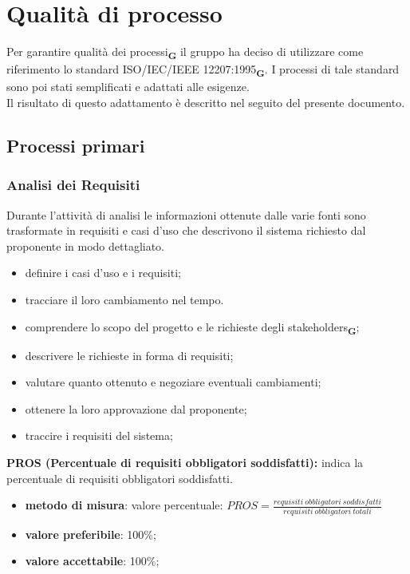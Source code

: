 \section{Qualità di processo}
Per garantire qualità dei processi\textsubscript{\textbf{G}} il gruppo ha deciso di utilizzare come riferimento lo standard ISO/IEC/IEEE 12207:1995\textsubscript{\textbf{G}}. 
I processi di tale standard sono poi stati semplificati e adattati alle esigenze.\\Il risultato di questo adattamento è descritto nel seguito del presente documento.
\subsection{Processi primari}
\subsubsection{Analisi dei Requisiti}
Durante l'attività di analisi le informazioni ottenute dalle varie fonti sono trasformate in requisiti e casi d'uso che descrivono il sistema richiesto
dal proponente in modo dettagliato.
\begin{itemize}
    \item definire i casi d'uso e i requisiti;
    \item tracciare il loro cambiamento nel tempo.
\end{itemize}
\begin{itemize}
    \item comprendere lo scopo del progetto e le richieste degli stakeholders\textsubscript{\textbf{G}};
    \item descrivere le richieste in forma di requisiti;
    \item valutare quanto ottenuto e negoziare eventuali cambiamenti;
    \item ottenere la loro approvazione dal proponente;
    \item traccire i requisiti del sistema;
\end{itemize}
\textbf{PROS (Percentuale di requisiti obbligatori soddisfatti):} indica la percentuale di requisiti obbligatori soddisfatti.
\begin{itemize}
    \item \textbf{metodo di misura}: valore percentuale: $PROS = \frac{requisiti \ obbligatori \ soddisfatti}{requisiti \ obbligatori \ totali}$
    \item \textbf{valore preferibile}: 100\%;
    \item \textbf{valore accettabile}: 100\%;
\end{itemize}
